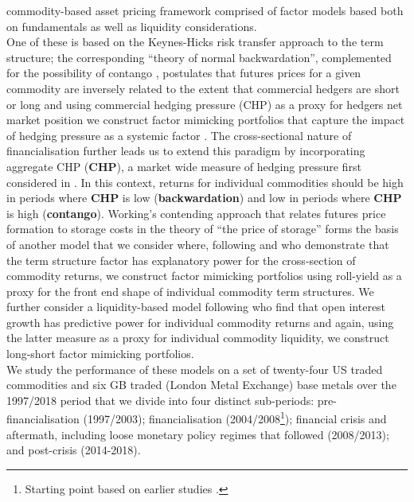 \documentclass[
  authoryear,
  preprint,
  3p]{elsarticle}
\begin{document}
commodity-based asset pricing framework comprised of factor models based
both on fundamentals as well as liquidity considerations.\\
One of these is based on the Keynes-Hicks
\citep{keynes_some_1923, keynes_treatise_1930, hicks_value_1939, hicks_value_1946}
risk transfer approach to the term structure; the corresponding ``theory
of normal backwardation'', complemented for the possibility of contango
\citep{houthakker_restatement_1957, cootner_returns_1960}, postulates
that futures prices for a given commodity are inversely related to the
extent that commercial hedgers are short or long and using commercial
hedging pressure (CHP) as a proxy for hedgers net market position we
construct factor mimicking portfolios that capture the impact of hedging
pressure as a systemic factor \citep{basu_capturing_2013}. The
cross-sectional nature of financialisation
\citep{cheng_financialisation_2014, basak_model_2016} further leads us
to extend this paradigm by incorporating aggregate CHP (\textbf{CHP}), a
market wide measure of hedging pressure first considered in
\citet{hong_what_2012}. In this context, returns for individual
commodities should be high in periods where \textbf{CHP} is low
(\textbf{backwardation}) and low in periods where \textbf{CHP} is high
(\textbf{contango}). Working's contending approach that relates futures
price formation to storage costs in the theory of ``the price of
storage'' \citep{working_theory_1949} forms the basis of another model
that we consider where, following \citet{szymanowska_anatomy_2014} and
\citet{fuertes_commodity_2015} who demonstrate that the term structure
factor has explanatory power for the cross-section of commodity returns,
we construct factor mimicking portfolios using roll-yield as a proxy for
the front end shape of individual commodity term structures. We further
consider a liquidity-based model following \citet{hong_what_2012} who
find that open interest growth has predictive power for individual
commodity returns and again, using the latter measure as a proxy for
individual commodity liquidity, we construct long-short factor mimicking
portfolios.\\
We study the performance of these models on a set of twenty-four US
traded commodities and six GB traded (London Metal Exchange) base metals
over the 1997/2018 period that we divide into four distinct sub-periods:
pre-financialisation (1997/2003); financialisation
(2004/2008\footnote{Starting point based on earlier studies
  \citep{baker_financialization_2021, christoffersen_factor_2014}.});
financial crisis and aftermath, including loose monetary policy regimes
that followed (2008/2013); and post-crisis (2014-2018).
\end{document}
